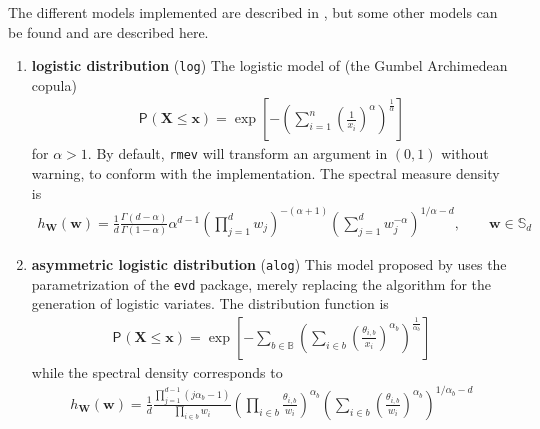 \documentclass{article}
\newcommand{\bs}[1]{\boldsymbol {#1}}
\renewcommand{\P}[2][]{{\mathsf P}_{#1}\left(#2\right)}
\newcommand{\code}[1]{\texttt{#1}}
\newcommand{\sumi}{\sum_{i=1}^n}
\newcommand{\pfrac}[2]{\left(\frac{#1}{#2}\right)}
\begin{document}
The different models implemented are described in \cite{Dombry:2016}, but some other models can be found and are described here.
\begin{enumerate}

\item \textbf{logistic distribution} (\code{log})
The logistic model of \cite{Gumbel:1960} (the Gumbel Archimedean copula) 
\begin{align*}
   \P{\bs{X} \leq \bs{x}}= \exp \left[ - \left(\sumi \pfrac{1}{x_i}^{\alpha}\right)^{\frac{1}{\alpha}}\right]
\end{align*}
for $\alpha>1.$ By default, \code{rmev} will transform an argument in $(0,1)$ without warning, to conform with the 
implementation. The spectral measure density is 
\begin{align*}
   h_{\bs{W}}(\bs{w})=\frac{1}{d}\frac{\Gamma(d-\alpha)}{\Gamma(1-\alpha)}\alpha^{d-1}\left( \prod_{j=1}^d 
w_j\right)^{-(\alpha+1)}\left(\sum_{j=1}^d
   w_j^{-\alpha}\right)^{1/\alpha-d}, \qquad \bs{w} \in \mathbb{S}_d
\end{align*}

\item \textbf{asymmetric logistic distribution} (\code{alog})
This model proposed by  \cite{Tawn:1990} uses the parametrization of the \code{evd} package, merely replacing the algorithm for 
the generation of logistic 
variates. The distribution function is
\begin{align*}
   \P{\bs{X} \leq \bs{x}} = \exp \left[ -\sum_{b \in \mathbb{B}}\left(\sum_{i \in b} \pfrac{\theta_{i, 
b}}{x_i}^{\alpha_b}\right)^{\frac{1}{\alpha_b}}\right]
\end{align*}
while the spectral density corresponds to 
\begin{align*}
   h_{\bs{W}}(\bs{w})=\frac{1}{d}\frac{\prod_{j=1}^{d-1} (j\alpha_b-1)}{\prod_{i\in b} w_i} \left(\prod_{i \in 
b}\frac{\theta_{i,b}}{w_i}\right)^{\alpha_b} \left(\sum_{i \in b} \pfrac{\theta_{i, b}}{w_i}^{\alpha_b}\right)^{1/\alpha_b-d}
\end{align*}


\end{enumerate}
\end{document}
